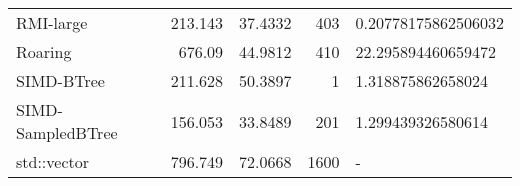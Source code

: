 \begin{tabular}{lrrrl}
 RMI-large         &                213.143 &               37.4332 &          403 & 0.20778175862506032   \\
 Roaring           &                676.09  &               44.9812 &          410 & 22.295894460659472    \\
 SIMD-BTree        &                211.628 &               50.3897 &            1 & 1.318875862658024     \\
 SIMD-SampledBTree &                156.053 &               33.8489 &          201 & 1.299439326580614     \\
 std::vector       &                796.749 &               72.0668 &         1600 & -                     \\
\hline
\end{tabular}
